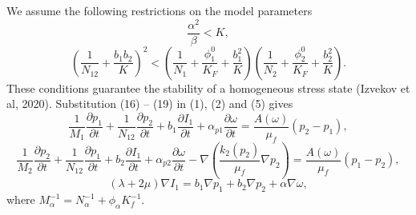 \documentclass[article,authoryear,jpm]{beg_39}             %
\begin{document}
We assume the following restrictions on the model parameters
\begin{equation}
\frac{{{\alpha }^{2}}}{\beta }<K,
\end{equation}
\begin{equation}
{{\left( \frac{1}{{{N}_{12}}}+\frac{{{b}_{1}}{{b}_{2}}}{K} \right)}^{2}}<\left( \frac{1}{{{N}_{1}}}+\frac{\phi _{1}^{0}}{{{K}_{F}}}+\frac{b_{1}^{2}}{K} \right)\left( \frac{1}{{{N}_{2}}}+\frac{\phi _{2}^{0}}{{{K}_{F}}}+\frac{b_{2}^{2}}{K} \right).
\end{equation}
These conditions guarantee the stability of a homogeneous stress state (Izvekov et al, 2020).
Substitution (16) – (19) in (1), (2) and (5) gives
\begin{equation}
\frac{1}{{{M}_{1}}}\frac{\partial {{p}_{1}}}{\partial t}+\frac{1}{{{N}_{12}}}\frac{\partial {{p}_{2}}}{\partial t}+{{b}_{1}}\frac{\partial {{I}_{1}}}{\partial t}+{{\alpha }_{p1}}\frac{\partial \omega }{\partial t}=\frac{A(\omega )}{{{\mu }_{f}}}({{p}_{2}}-{{p}_{1}}),
\end{equation}
\begin{equation}
\frac{1}{{{M}_{2}}}\frac{\partial {{p}_{2}}}{\partial t}+\frac{1}{{{N}_{12}}}\frac{\partial {{p}_{1}}}{\partial t}+{{b}_{2}}\frac{\partial {{I}_{1}}}{\partial t}+{{\alpha }_{p2}}\frac{\partial \omega }{\partial t}-\nabla \left( \frac{{{k}_{2}}({{p}_{2}})}{{{\mu }_{f}}}\nabla {{p}_{2}} \right)=\frac{A(\omega )}{{{\mu }_{f}}}({{p}_{1}}-{{p}_{2}}),
\end{equation}
\begin{equation}
(\lambda +2\mu )\nabla {{I}_{1}}={{b}_{1}}\nabla {{p}_{1}}+{{b}_{2}}\nabla {{p}_{2}}+\alpha \nabla \omega,	
\end{equation}
where $M_{\alpha }^{-1}=N_{\alpha }^{-1}+\phi _{\alpha }^{{}}K_{f}^{-1}$.
\end{document}
